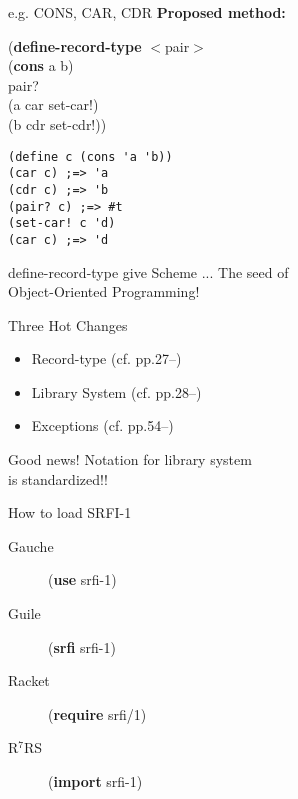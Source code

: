 \documentclass[dvipdfm,12pt,fleqn]{beamer}
\begin{document}
\begin{frame}[containsverbatim]{e.g. CONS, CAR, CDR}
\textbf{Proposed method:}
\begin{screen}
(\textbf{define-record-type} $<$pair$>$\\
\hspace{1em}(\textbf{cons} a b)\\
\hspace{1em}pair?\\
\hspace{1em}(a car set-car!)\\
\hspace{1em}(b cdr set-cdr!))
\end{screen}

\begin{multicols}{2}
\begin{verbatim}
(define c (cons 'a 'b))
(car c) ;=> 'a
(cdr c) ;=> 'b
(pair? c) ;=> #t
(set-car! c 'd)
(car c) ;=> 'd
\end{verbatim}
\end{multicols}
\end{frame}

\begin{frame}{define-record-type give Scheme ...}
\Huge\pause
The seed of\\
\alert{Object-Oriented} Programming!
\end{frame}

\begin{frame}{Three Hot Changes\footnotemark[1]}
\huge
\begin{itemize}
\item Record-type (cf. pp.27--)
\item \alert{Library System} (cf. pp.28--)
\item Exceptions (cf. pp.54--)
\end{itemize}

\end{frame}

\begin{frame}{Good news!}
\huge
Notation for library system\\
is \alert{standardized}!!
\end{frame}

\begin{frame}{How to load SRFI-1}
\Huge
\begin{description}
\item[Gauche] (\textbf{use} srfi-1)
\item[Guile] (\textbf{srfi} srfi-1)
\item[Racket] (\textbf{require} srfi/1)
\pause
\item[R$^7$RS] (\alert{\textbf{import}} srfi-1)
\end{description}
\end{frame}
\end{document}
